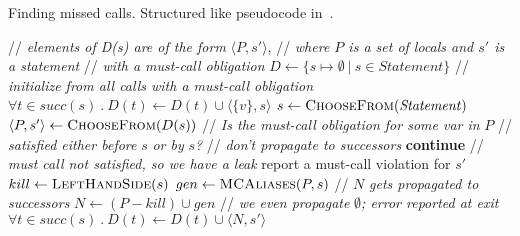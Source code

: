 \begin{algorithm}[t]
  \caption{Finding missed calls.  Structured like pseudocode in~\cite{TorlakC10}.}
  \label{alg:consistency-checker}
  \begin{algorithmic}[1]
  \State // \textit{elements of D(s) are of the form} $\langle P, s' \rangle$,
  \State // \textit{where $P$ is a set of locals and $s'$ is a statement}
  \State // \textit{with a must-call obligation}
  \State $D \gets \{ s \mapsto \emptyset\ |\ s \in \mathit{Statement} \}$
  \State // \textit{initialize from all calls with a must-call obligation}
   \label{li:start-init}
      \State $\forall t \in \mathit{succ}(s)\ .\ D(t) \leftarrow D(t) \cup \langle \{v\}, s \rangle$
    \EndFor \label{li:end-init}
  \EndFor
    \State $s \gets \textsc{ChooseFrom}(\mathit{Statement})$
    \State $\langle P, s' \rangle \gets \textsc{ChooseFrom}(D(s))$
    \State // \textit{Is the must-call obligation for some var in } $P$
    \State // \textit{satisfied either before }$s$\textit{ or by } $s$\textit{?}
     \label{li:check-satisfied}
    \State // \textit{don't propagate to successors}
    \State \textbf{continue} 
    \EndIf
     \label{li:end-scope}
      \State // \textit{must call not satisfied, so we have a leak}
      \State report a must-call violation for $s'$
    \Else
    \State $kill \gets \textsc{LeftHandSide}(s)$ \label{li:compute-kill}
    \State $gen \gets \textsc{MCAliases}(P,s)$ \label{li:compute-gen}
    \State // $N$ \textit{gets propagated to successors}
    \State $N \gets (P - kill) \cup gen$ \label{li:compute-new-mc-aliases}
    \State // \textit{we even propagate }$\emptyset$\textit{; error reported at exit}
    \State $\forall t \in \mathit{succ}(s)\ .\ D(t) \leftarrow D(t) \cup \langle
    N, s' \rangle$ \label{li:prop-to-succs}
    \EndIf
  \EndWhile \label{li:alg-loop-end}
  \EndProcedure
  \end{algorithmic}
\end{algorithm}

